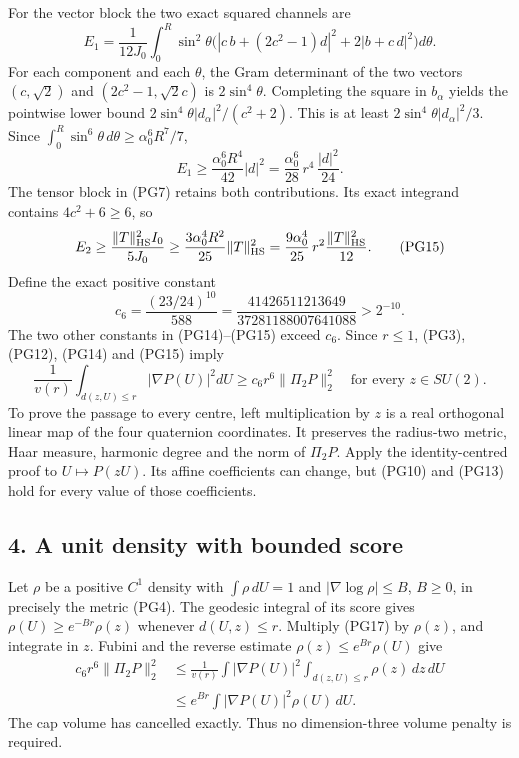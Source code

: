 \documentclass[11pt]{article}
\begin{document}
For the vector block the two exact squared channels are
\[
 E_1=\frac1{12J_0}\int_0^R\sin^2\theta
 \bigl(|c\,b+(2c^2-1)d|^2+2|b+c\,d|^2\bigr)d\theta .
 \tag{PG13}
\]
For each component and each \(\theta\), the Gram determinant of
the two vectors \((c,\sqrt2)\) and \((2c^2-1,\sqrt2c)\) is
\(2\sin^4\theta\). Completing the square in \(b_\alpha\) yields
the pointwise lower bound
\(2\sin^4\theta|d_\alpha|^2/(c^2+2)\).
This is at least \(2\sin^4\theta|d_\alpha|^2/3\).
Since \(\int_0^R\sin^6\theta\,d\theta\ge\alpha_0^6R^7/7\),
\[
 E_1\ge\frac{\alpha_0^6R^4}{42}|d|^2
       =\frac{\alpha_0^6}{28}\,r^4\,\frac{|d|^2}{24}.
 \tag{PG14}
\]
The tensor block in (PG7) retains both contributions. Its exact
integrand contains \(4c^2+6\ge6\), so
\[
 E_2\ge\frac{\|T\|_{\rm HS}^2I_0}{5J_0}
       \ge\frac{3\alpha_0^4R^2}{25}\|T\|_{\rm HS}^2
       =\frac{9\alpha_0^4}{25}\,r^2
                       \frac{\|T\|_{\rm HS}^2}{12}.
 \tag{PG15}
\]
Define the exact positive constant
\[
 c_6=\frac{(23/24)^{10}}{588}
     =\frac{41426511213649}{37281188007641088}
     >2^{-10}.
 \tag{PG16}
\]
The two other constants in (PG14)–(PG15) exceed \(c_6\).
Since \(r\le1\), (PG3), (PG12), (PG14) and (PG15) imply
\[
 \frac1{v(r)}\int_{d(z,U)\le r}|\nabla P(U)|^2dU
                  \ge c_6r^6\|\Pi_2P\|_2^2
 \quad\text{for every }z\in SU(2).
 \tag{PG17}
\]
To prove the passage to every centre, left multiplication by \(z\)
is a real orthogonal linear map of the four quaternion coordinates.
It preserves the radius-two metric, Haar measure, harmonic degree
and the norm of \(\Pi_2P\). Apply the identity-centred proof to
\(U\mapsto P(zU)\). Its affine coefficients can change, but (PG10)
and (PG13) hold for every value of those coefficients.

\subsection*{4. A unit density with bounded score}

Let \(\rho\) be a positive \(C^1\) density with
\(\int\rho\,dU=1\) and \(|\nabla\log\rho|\le B\), \(B\ge0\),
in precisely the metric (PG4). The geodesic integral of its score
gives \(\rho(U)\ge e^{-Br}\rho(z)\) whenever \(d(U,z)\le r\).
Multiply (PG17) by \(\rho(z)\), and integrate in \(z\).
Fubini and the reverse estimate
\(\rho(z)\le e^{Br}\rho(U)\) give
\[
 \begin{aligned}
 c_6r^6\|\Pi_2P\|_2^2
 &\le\frac1{v(r)}\int|\nabla P(U)|^2
                      \int_{d(z,U)\le r}\rho(z)\,dz\,dU\\
 &\le e^{Br}\int|\nabla P(U)|^2\rho(U)\,dU .
 \end{aligned}\tag{PG18}
\]
The cap volume has cancelled exactly. Thus no dimension-three
volume penalty is required.
\end{document}

